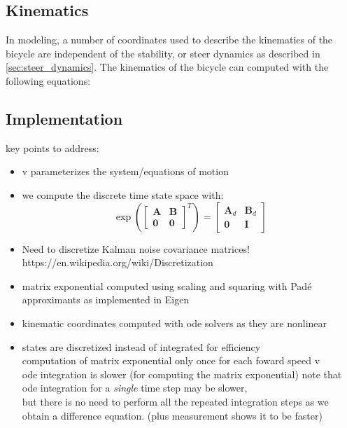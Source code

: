 \documentclass[11pt,a4paper,reqno]{amsart}
\newcommand{\stateMat}{\bm{A}}
\newcommand{\inputMat}{\bm{B}}
\begin{document}
\subsection{Kinematics}

In modeling, a number of coordinates used to describe the kinematics of the bicycle are independent of the stability, or
steer dynamics as described in \autoref{sec:steer_dynamics}.
The kinematics of the bicycle can computed with the following equations:


\subsection{Implementation}
key points to address:
\begin{itemize}
    \item v parameterizes the system/equations of motion
    \item we compute the discrete time state space with:
        \begin{equation}
        \exp(\begin{bmatrix} \stateMat & \inputMat \\ \bm{0} & \bm{0} \end{bmatrix}^T)
            = \begin{bmatrix} \stateMat_d & \inputMat_d \\ \bm{0} & \bm{I} \end{bmatrix}
        \end{equation}
    \item Need to discretize Kalman noise covariance matrices!
        https://en.wikipedia.org/wiki/Discretization
    \item matrix exponential computed using scaling and squaring with
        Pad{\'e} approximants\cite{higham2005} as implemented in Eigen\cite{eigenweb}
    \item kinematic coordinates computed with ode solvers as they are nonlinear
    \item states are discretized instead of integrated for efficiency\\
        computation of matrix exponential only once for each foward speed v\\
        ode integration is slower\cite{moler2003} (for computing the matrix exponential)
        note that ode integration for a \textit{single} time step may be slower, \\
        but there is no need to perform all the repeated integration steps as
        we obtain a difference equation. (plus measurement shows it to be faster)
\end{itemize}
\end{document}
